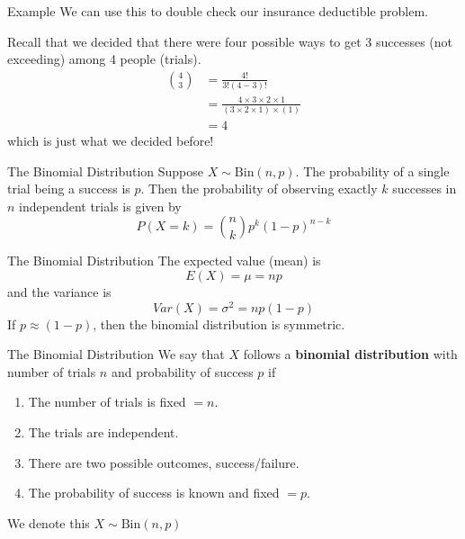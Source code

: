 \begin{frame}{Example}
    We can use this to double check our insurance deductible problem.
    
    \vspace{12pt}Recall that we decided that there were four possible ways to get 3 successes (not exceeding) among 4 people (trials).
    \begin{align*}
        {4 \choose 3} &= \frac{4!}{3!(4-3)!} \\
        &= \frac{4\times3\times2\times1}{(3\times2\times1)\times(1)} \\
        &= 4
    \end{align*}
    which is just what we decided before!    
\end{frame}

\begin{frame}{The Binomial Distribution}
    Suppose $X\sim\text{Bin}(n,p)$. The probability of a single trial being a success is $p$. Then the probability of observing exactly $k$ successes in $n$ independent trials is given by
    \[
        P(X=k) = {n \choose k} p^k (1-p)^{n-k}
    \]
\end{frame}

\begin{frame}{The Binomial Distribution}
    The expected value (mean) is
    \[
        E(X) = \mu = np
    \]
    and the variance is
    \[
        Var(X) = \sigma^2 = np(1-p)
    \]
    \vspace{12pt}If $p \approx (1-p)$, then the binomial distribution is symmetric.
\end{frame}

\begin{frame}{The Binomial Distribution}
    We say that $X$ follows a \textbf{binomial distribution} with number of trials $n$ and probability of success $p$ if
    \begin{enumerate}
        \item The number of trials is fixed $=n$.
        \item The trials are independent.
        \item There are two possible outcomes, success/failure.
        \item The probability of success is known and fixed $=p$.
    \end{enumerate}
    
    \vspace{12pt}We denote this $X\sim\text{Bin}(n,p)$
\end{frame}

